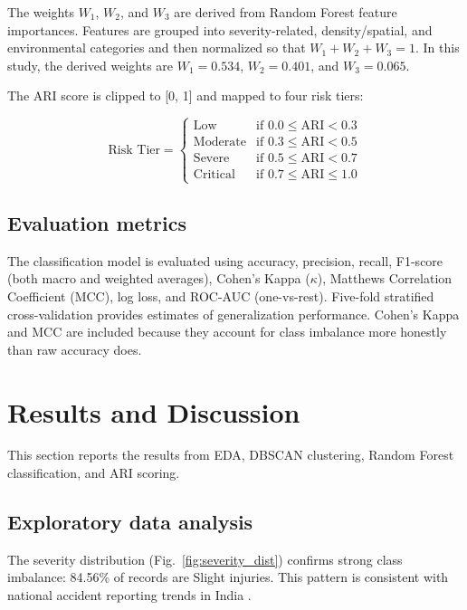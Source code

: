 \documentclass[conference]{IEEEtran}
\begin{document}
The weights $W_1$, $W_2$, and $W_3$ are derived from Random Forest feature importances. Features are grouped into severity-related, density/spatial, and environmental categories and then normalized so that $W_1 + W_2 + W_3 = 1$. In this study, the derived weights are $W_1 = 0.534$, $W_2 = 0.401$, and $W_3 = 0.065$.

The ARI score is clipped to [0, 1] and mapped to four risk tiers:

\begin{equation}
\text{Risk Tier} = 
\begin{cases}
\text{Low} & \text{if } 0.0 \leq \text{ARI} < 0.3 \\
\text{Moderate} & \text{if } 0.3 \leq \text{ARI} < 0.5 \\
\text{Severe} & \text{if } 0.5 \leq \text{ARI} < 0.7 \\
\text{Critical} & \text{if } 0.7 \leq \text{ARI} \leq 1.0
\end{cases}
\label{eq:tiers}
\end{equation}

\subsection{Evaluation metrics}

The classification model is evaluated using accuracy, precision, recall, F1-score (both macro and weighted averages), Cohen's Kappa ($\kappa$), Matthews Correlation Coefficient (MCC), log loss, and ROC-AUC (one-vs-rest). Five-fold stratified cross-validation provides estimates of generalization performance. Cohen's Kappa and MCC are included because they account for class imbalance more honestly than raw accuracy does.

\section{Results and Discussion}

This section reports the results from EDA, DBSCAN clustering, Random Forest classification, and ARI scoring.

\subsection{Exploratory data analysis}

The severity distribution (Fig.~\ref{fig:severity_dist}) confirms strong class imbalance: 84.56\% of records are Slight injuries. This pattern is consistent with national accident reporting trends in India \cite{b2}.
\end{document}
